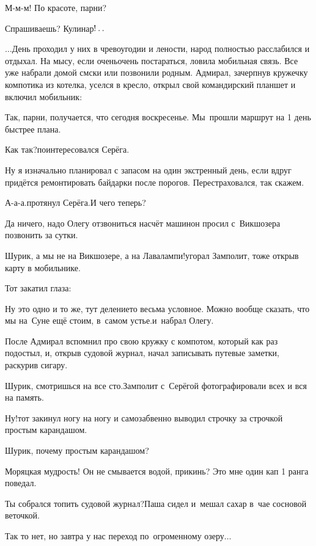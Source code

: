 \diagdash М-м-м! По красоте, парни?

\diagdash Спрашиваешь? Кулинар$\exldots$%

$\ldots$День проходил у них в чревоугодии и лености, народ полностью расслабился и отдыхал. На мысу, если очень\sdash очень  постараться, ловила мобильная связь. Все уже набрали домой смс\sdash ки или позвонили родным. Адмирал, зачерпнув кружечку компотика из котелка, уселся в кресло, открыл свой командирский планшет и включил мобильник:

\diagdash Так, парни, получается, что сегодня воскресенье. Мы~прошли маршрут на 1 день быстрее плана.

\diagdash Как так?\mdash поинтересовался Серёга.

\diagdash Ну я изначально планировал с запасом на один экстренный день, если вдруг придётся ремонтировать байдарки после порогов. Перестраховался, так скажем.

\diagdash А-а-а.\mdash протянул Серёга.\mdash И чего теперь?

\diagdash Да ничего, надо Олегу отзвониться насчёт машин\mdash он просил с~Викшозера позвонить за сутки.

\diagdash Шурик, а мы не на Викшозере, а на Лавалампи!\mdash угорал Замполит, тоже открыв карту в мобильнике.

Тот закатил глаза:

\diagdash Ну это одно и то же, тут деление\sdash то весьма условное. Можно вообще сказать, что мы на~Суне ещё стоим, в~самом устье.\mdash и~набрал Олегу.

После Адмирал вспомнил про свою кружку с компотом, который как раз подостыл, и, открыв судовой журнал, начал записывать путевые заметки, раскурив сигару.

\diagdash Шурик, смотришься на все сто.\mdash Замполит с~Серёгой фотографировали всех и вся на память.

\diagdash Ну!\mdash тот закинул ногу на ногу и самозабвенно выводил строчку за строчкой простым карандашом.

\diagdash Шурик, почему простым карандашом?

\diagdash Моряцкая мудрость! Он не смывается водой, прикинь? Это мне один кап 1 ранга поведал.

\diagdash Ты собрался топить судовой журнал?\mdash Паша сидел и~мешал сахар в~чае сосновой веточкой.

\diagdash Так то нет, но завтра у нас переход по~огроменному озеру$\ldots$

